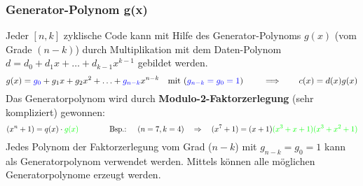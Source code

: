 \subsubsection{Generator-Polynom g(x) }
Jeder $[n,k]$ zyklische Code kann mit Hilfe des Generator-Polynoms $g(x)$ (vom Grade $(n-k)$)
durch Multiplikation mit dem Daten-Polynom $d=d_0 + d_1x + \ldots + d_{k-1}x^{k-1}$ gebildet werden.
$$ g(x) = \textcolor{blue}{g_0} + g_1 x + g_2 x^2 + \ldots + \textcolor{blue}{g_{n-k}} x^{n-k}
\quad \text{mit (} \textcolor{blue}{g_{n-k} = g_0 = 1} \text{) } \qquad \Longrightarrow \qquad
c(x) = d(x) g(x)$$
Das Generatorpolynom wird durch \textbf{Modulo-2-Faktorzerlegung} (sehr kompliziert) gewonnen: 
$$ (x^n + 1) = q(x) \cdot \textcolor{green}{g(x)} \qquad \qquad \text{Bsp.: } \quad (n=7,k=4) \quad
\Rightarrow \quad (x^7 + 1) = (x+1)\textcolor{green}{(x^3+x+1)(x^3+x^2+1)}$$ Jedes Polynom der
Faktorzerlegung vom Grad ($n-k$) mit $g_{n-k} = g_0 = 1$ kann als Generatorpolynom verwendet
werden. Mittels \textbf{} können alle möglichen Generatorpolynome
erzeugt werden.


